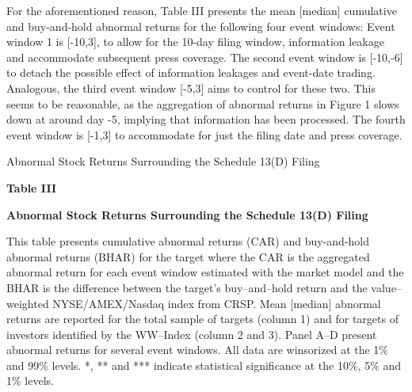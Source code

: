 \documentclass[12pt]{article}
\begin{document}
For the aforementioned reason, Table III presents the mean [median] cumulative and buy-and-hold abnormal returns for the following four event windows: Event window 1 is [-10,3], to allow for the 10-day filing window, information leakage and accommodate subsequent press coverage. The second event window is [-10,-6] to detach the possible effect of information leakages and event-date trading. Analogous, the third event window [-5,3] aims to control for these two. This seems to be reasonable, as the aggregation of abnormal returns in Figure 1 slows down at around day -5, implying that information has been processed. The fourth event window is [-1,3] to accommodate for just the filing date and press coverage.

\begin{table}[!htbp]
	\centering
	\captionsetup{textformat=empty,labelformat=blank}
	\caption{Abnormal Stock Returns Surrounding the Schedule 13(D) Filing}
	\textbf{Table III}\par\medskip
	\large\textbf{Abnormal Stock Returns Surrounding the Schedule 13(D) Filing}\par\medskip
	\justifying
	\footnotesize\noindent{}This table presents cumulative abnormal returns (CAR) and buy-and-hold abnormal returns (BHAR) for the target where the CAR is the aggregated abnormal return for each event window estimated with the market model and the BHAR is the difference between the target's buy–and–hold return and the value–weighted NYSE/AMEX/Nasdaq index from CRSP. Mean [median] abnormal returns  are reported for the total sample of targets (column 1) and  for targets of investors identified by the WW–Index (column 2 and 3). Panel A--D present abnormal returns for several event windows. All data are winsorized at the 1\% and 99\% levels. *, ** and *** indicate statistical significance at the 10\%, 5\% and 1\% levels.\par\medskip
	\centering													
	\begin{adjustbox}{width=\textwidth}

\end{adjustbox}
\end{table}
\end{document}
